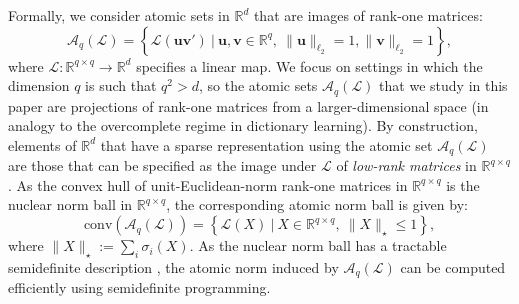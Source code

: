 \documentclass[11pt,letterpaper]{article}
\newcommand{\R}{\mathbb{R}}
\newcommand{\A}{\mathcal{A}}
\newcommand{\bu}{\mathbf{u}}
\newcommand{\bv}{\mathbf{v}}
\renewcommand{\L}{\mathcal{L}}
\begin{document}
Formally, we consider atomic sets in $\R^d$ that are images of rank-one matrices:
\begin{equation}
\A_{q}(\L) = \left\{\L (\bu \bv') ~|~ \bu, \bv \in \R^q, ~ \|\bu\|_{\ell_2} = 1, \|\bv\|_{\ell_2} = 1 \right\}, \label{eq:lowrankatoms}
\end{equation}
where $\L : \R^{q \times q} \rightarrow \R^d$ specifies a linear map. We focus on settings in which the dimension $q$ is such that $q^2 > d$, so the atomic sets $\A_{q}(\L)$ that we study in this paper are projections of rank-one matrices from a larger-dimensional space (in analogy to the overcomplete regime in dictionary learning).  By construction, elements of $\R^d$ that have a sparse representation using the atomic set $\A_{q}(\L)$ are those that can be specified as the image under $\L$ of \emph{low-rank matrices} in $\R^{q \times q}$.  As the convex hull of unit-Euclidean-norm rank-one matrices in $\R^{q \times q}$ is the nuclear norm ball in $\R^{q \times q}$, the corresponding atomic norm ball is given by:
\begin{equation}
\mathrm{conv}\left(\A_{q}(\L)\right) = \left\{ \L (X) ~|~ X \in \R^{q \times q}, ~ \|X\|_\star \leq 1 \right\}, \label{eq:nuclearimage}
\end{equation}
where $\|X\|_\star := \sum_{i} \sigma_i(X)$.  As the nuclear norm ball has a tractable semidefinite description \cite{Faz:02,RFP:10}, the atomic norm induced by $\A_{q}(\L)$ can be computed efficiently using semidefinite programming.

\end{document}
